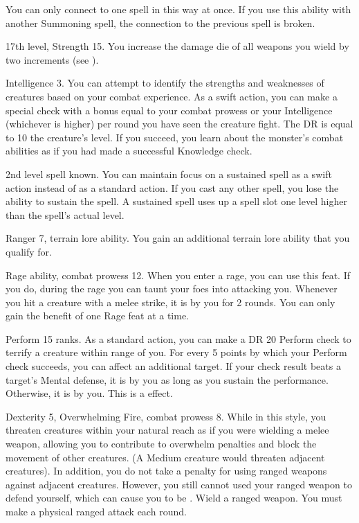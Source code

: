 You can only connect to one spell in this way at once.
If you use this ability with another Summoning spell, the connection to the previous spell is broken.

\featpres 17th level, Strength 15.
\featben You increase the damage die of all weapons you wield by two increments (see ).

\featpre Intelligence 3.
\featben You can attempt to identify the strengths and weaknesses of creatures based on your combat experience.
As a swift action, you can make a special check with a bonus equal to your combat prowess or your Intelligence (whichever is higher)  per round you have seen the creature fight.
The DR is equal to 10 \add the creature's level.
If you succeed, you learn about the monster's combat abilities as if you had made a successful Knowledge check.

\featpre 2nd level spell known.
\featben You can maintain focus on a sustained spell as a swift action instead of as a standard action.
If you cast any other spell, you lose the ability to sustain the spell.
A sustained spell uses up a spell slot one level higher than the spell's actual level.

\featpres Ranger 7, terrain lore ability.
\featben You gain an additional terrain lore ability that you qualify for.

\featpres Rage ability, combat prowess 12.
\featben When you enter a rage, you can use this feat. If you do, during the rage you can taunt your foes into attacking you.
Whenever you hit a creature with a melee strike, it is \goaded by you for 2 rounds.
 You can only gain the benefit of one Rage feat at a time.

\featpre Perform 15 ranks.
\featben As a standard action, you can make a DR 20 Perform check to terrify a creature within \rngmed range of you.
For every 5 points by which your Perform check succeeds, you can affect an additional target.
If your check result beats a target's Mental defense, it is \frightened by you as long as you sustain the performance.
Otherwise, it is \shaken by you.
This is a  effect.

\featpres Dexterity 5, Overwhelming Fire, combat prowess 8.
\featben While in this style, you threaten creatures within your natural reach as if you were wielding a melee weapon, allowing you to contribute to overwhelm penalties and block the movement of other creatures.
(A Medium creature would threaten adjacent creatures).
In addition, you do not take a  penalty for using ranged weapons against adjacent creatures.
However, you still cannot used your ranged weapon to defend yourself, which can cause you to be .
\stylereq Wield a ranged weapon.
You must make a physical ranged attack each round.

